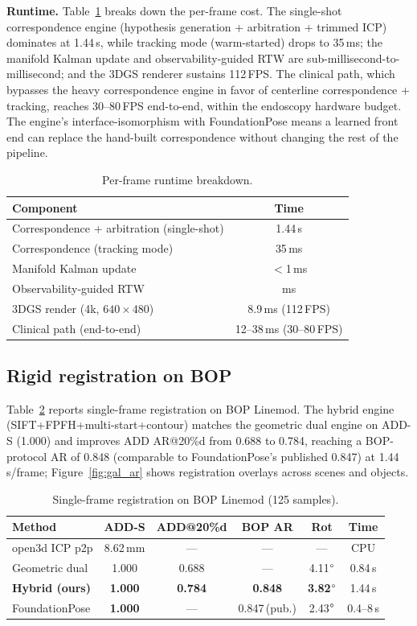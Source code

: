 \documentclass[9pt,twoside,web]{ieeecolor2}
\begin{document}
\textbf{Runtime.} Table~\ref{tab:runtime} breaks down the per-frame cost. The single-shot correspondence engine (hypothesis generation + arbitration + trimmed ICP) dominates at 1.44\,s, while tracking mode (warm-started) drops to 35\,ms; the manifold Kalman update and observability-guided RTW are sub-millisecond-to-millisecond; and the 3DGS renderer sustains 112\,FPS. The clinical path, which bypasses the heavy correspondence engine in favor of centerline correspondence + tracking, reaches 30--80\,FPS end-to-end, within the endoscopy hardware budget. The engine's interface-isomorphism with FoundationPose means a learned front end can replace the hand-built correspondence without changing the rest of the pipeline.

\begin{table}[t]
\centering
\caption{Per-frame runtime breakdown.}
\label{tab:runtime}
\begin{tabular}{lc}
\toprule
Component & Time \\
\midrule
Correspondence + arbitration (single-shot) & 1.44\,s \\
Correspondence (tracking mode) & 35\,ms \\
Manifold Kalman update & $<$1\,ms \\
Observability-guided RTW & ms \\
3DGS render (4k, $640\times480$) & 8.9\,ms (112\,FPS) \\
Clinical path (end-to-end) & 12--38\,ms (30--80\,FPS) \\
\bottomrule
\end{tabular}
\end{table}

\subsection{Rigid registration on BOP}
Table~\ref{tab:bop} reports single-frame registration on BOP Linemod. The hybrid engine (SIFT+FPFH+multi-start+contour) matches the geometric dual engine on ADD-S (1.000) and improves ADD AR@20\%d from 0.688 to 0.784, reaching a BOP-protocol AR of 0.848 (comparable to FoundationPose's published 0.847) at 1.44\,s/frame; Figure~\ref{fig:gal_ar} shows registration overlays across scenes and objects.

\begin{table}[t]
\centering
\caption{Single-frame registration on BOP Linemod (125 samples).}
\label{tab:bop}
\setlength{\tabcolsep}{4pt}\small
\begin{tabular}{lccccc}
\toprule
Method & ADD-S & ADD@20\%d & BOP AR & Rot & Time \\
\midrule
open3d ICP p2p & 8.62\,mm & --- & --- & --- & CPU \\
Geometric dual & 1.000 & 0.688 & --- & 4.11$\degree$ & 0.84\,s \\
\textbf{Hybrid (ours)} & \textbf{1.000} & \textbf{0.784} & \textbf{0.848} & \textbf{3.82}$\degree$ & 1.44\,s \\
FoundationPose & \textbf{1.000} & --- & 0.847\,(pub.) & 2.43$\degree$ & 0.4--8\,s \\
\bottomrule
\end{tabular}
\end{table}
\end{document}
